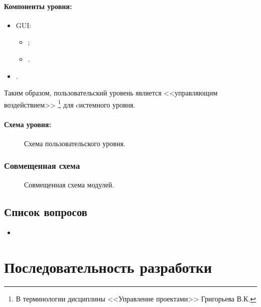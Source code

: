 \documentclass[12pt,a4paper,fullpage,titlepage]{article}
\begin{document}
\paragraph{Компоненты уровня:}
\begin{itemize}
	\item GUI:
	\begin{itemize}
		\item ;
		\item .
	\end{itemize}
	\item .\\
\end{itemize}

Таким образом, пользовательский уровень является <<управляющим воздействием>> \footnote{В терминологии дисциплины <<Управление проектами>> Григорьева В.К.} для cистемного уровня.\\

\paragraph{Схема уровня:}
\begin{figure}[thbp!]
	\centering
	
	\caption{Схема пользовательского уровня.}
\end{figure}

\newpage
\subsubsection{Совмещенная схема}
\begin{figure}[thbp!]
	\centering
	
	\caption{Совмещенная схема модулей.}
\end{figure}

\newpage
\subsection{Список вопросов}
\begin{itemize}
	\item
\end{itemize}

\newpage
\section{Последовательность разработки}
\end{document}
